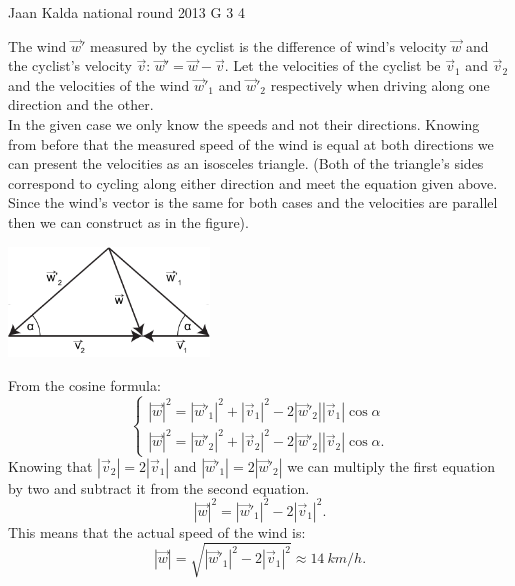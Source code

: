 \documentclass[11pt]{article}
\begin{document}
{Jaan Kalda} %
{national round} %
{2013} %
{G 3} %
{4} %
{

\ifEngSolution
The wind $\vec w'$ measured by the cyclist is the difference of wind’s velocity $\vec w$ and the cyclist’s velocity $\vec v$: $\vec w'=\vec w - \vec v$. Let the velocities of the cyclist be $\vec v_1$ and $\vec v_2$ and the velocities of the wind $\vec w'_1$ and $\vec w'_2$ respectively when driving along one direction and the other.\\
In the given case we only know the speeds and not their directions. Knowing from before that the measured speed of the wind is equal at both directions we can present the velocities as an isosceles triangle. (Both of the triangle’s sides correspond to cycling along either direction and meet the equation given above. Since the wind’s vector is the same for both cases and the velocities are parallel then we can construct as in the figure).
\begin{center}
\includegraphics[width=0.4\textwidth]{2013-v3g-03-jalgrattur}\\
\end{center}
From the cosine formula:
$$
\begin{cases}
|\vec w|^2 = |\vec w'_1|^2 + |\vec v_1|^2  - 2  |\vec w'_2|  |\vec v_1|\cos \alpha \\
|\vec w|^2 = |\vec w'_2|^2 + |\vec v_2|^2  - 2  |\vec w'_2|  |\vec v_2|\cos \alpha.
\end{cases}
$$
Knowing that $ |\vec v_2|=2 |\vec v_1|$ and $ |\vec w'_1|=2 |\vec w'_2|$ we can multiply the first equation by two and subtract it from the second equation.
$$|\vec w|^2 = |\vec w'_1|^2 - 2|\vec v_1|^2. $$
This means that the actual speed of the wind is:
$$|\vec w|=\sqrt{|\vec w'_1|^2-2|\vec v_1|^2} \approx \SI{14}{km \per h}.$$
\fi
}
\end{document}
